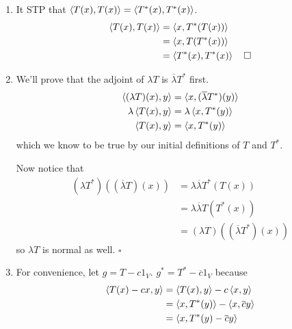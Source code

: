 \documentclass[12pt]{article}
\begin{document}
\begin{enumerate}
\begin{enumerate}
                  \item \label{list:3a} It STP that $\braket{T(x), T(x)}=\braket{T^*(x), T^*(x)}$.
                        \begin{align*}
                              \braket{T(x), T(x)} & = \braket{x, T^*(T(x))}               \\
                                                  & = \braket{x, T(T^*(x))}               \\
                                                  & = \braket{T^*(x), T^*(x)}\quad\square
                        \end{align*}
                  \item We'll prove that the adjoint of $\lambda T$ is $\overline{\lambda} T^*$ first.
                        \begin{gather*}
                              \braket{(\lambda T)(x), y} = \braket{x, (\overline{\lambda} T^*)(y)} \\
                              \lambda \braket{T(x), y}= \lambda \braket{x, T^*(y)} \\
                              \braket{T(x), y}= \braket{x, T^*(y)}
                        \end{gather*}
                        which we know to be true by our initial definitions of $T$ and $T^*$.

                        Now notice that
                        \begin{align*}
                              (\lambda T^*)((\overline{\lambda} T)(x)) & = \lambda\overline{\lambda} T^*(T(x))      \\
                                                                       & = \lambda\overline{\lambda} T(T^*(x))      \\
                                                                       & = (\lambda T)((\overline{\lambda} T^*)(x))
                        \end{align*}
                        so $\lambda T$ is normal as well. $\square$
                  \item \label{list:3c} For convenience, let $g=T-c\mathrm{1}_V$.
                        $g^*=T^*-\overline{c}\mathrm{1}_V$ because
                        \begin{align*}
                              \braket{T(x)-cx, y} & = \braket{T(x), y}-c\braket{x, y}              \\
                                                  & = \braket{x, T^*(y)}-\braket{x, \overline{c}y} \\
                                                  & = \braket{x, T^*(y)-\overline{c}y}
                        \end{align*}


\end{enumerate}
\end{enumerate}
\end{document}
